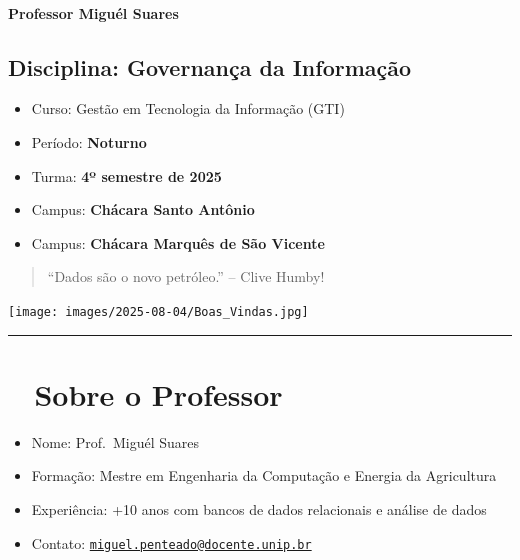 \documentclass[
]{book}
\providecommand{\tightlist}{%
  \setlength{\itemsep}{0pt}\setlength{\parskip}{0pt}}
\begin{document}
\subsubsection*{Professor Miguél Suares}\label{professor-miguuxe9l-suares}

\section{\texorpdfstring{Disciplina: \textbf{Governança da Informação}}{Disciplina: Governança da Informação}}\label{disciplina-governanuxe7a-da-informauxe7uxe3o}

\begin{itemize}
\tightlist
\item
  Curso: Gestão em Tecnologia da Informação (GTI)\\
\item
  Período: \textbf{Noturno}\\
\item
  Turma: \textbf{4º semestre de 2025}
\item
  Campus: \textbf{Chácara Santo Antônio}
\item
  Campus: \textbf{Chácara Marquês de São Vicente}
\end{itemize}

\begin{quote}
``Dados são o novo petróleo.'' -- Clive Humby!
\end{quote}

\texttt{[image: images/2025-08-04/Boas\_Vindas.jpg]}

\begin{center}\rule{0.5\linewidth}{0.5pt}\end{center}

\chapter{👨‍🏫 Sobre o Professor}\label{sobre-o-professor}

\begin{itemize}
\item
  Nome: Prof.~Miguél Suares
\item
  Formação: Mestre em Engenharia da Computação e Energia da Agricultura
\item
  Experiência: +10 anos com bancos de dados relacionais e análise de dados
\item
  Contato: \href{mailto:miguel.penteado@docente.unip.br}{\nolinkurl{miguel.penteado@docente.unip.br}}
\end{itemize}
\end{document}
